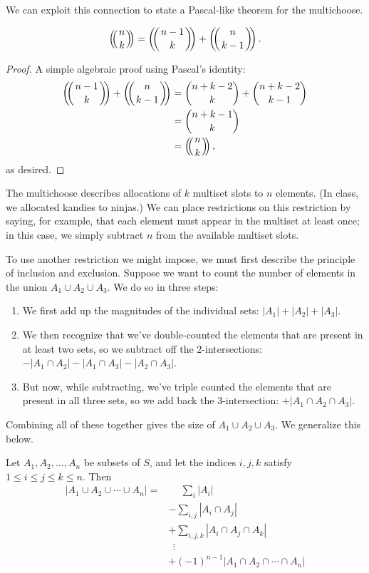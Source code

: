 \documentclass[../m055main.tex]{subfiles}
\begin{document}
We can exploit this connection to state a Pascal-like theorem for the multichoose.

\begin{theorem}[]
    \[ \mchoose{n}{k} = \mchoose{n-1}{k} + \mchoose{n}{k-1}. \]
\end{theorem}

\begin{proof}
    A simple algebraic proof using Pascal's identity:
    \begin{align*}
        \mchoose{n-1}{k} + \mchoose{n}{k-1} &= {n+k-2 \choose k} + {n+k-2 \choose k-1} \\
        &= {n+k-1 \choose k} \\
        &= \mchoose{n}{k},
    \end{align*}
    as desired.
\end{proof}

The multichoose describes allocations of $k$ multiset slots to $n$ elements.
(In class, we allocated kandies to ninjas.)
We can place restrictions on this restriction by saying, for example, that each element must appear in the multiset at least once; in this case, we simply subtract $n$ from the available multiset slots.

To use another restriction we might impose, we must first describe the principle of inclusion and exclusion.
Suppose we want to count the number of elements in the union $A_1 \cup A_2 \cup A_3$.
We do so in three steps:
\begin{enumerate}
    \item We first add up the magnitudes of the individual sets: $|A_1| + |A_2| + |A_3|$.
    \item We then recognize that we've double-counted the elements that are present in at least two sets, so we subtract off the 2-intersections: $- |A_1 \cap A_2| - |A_1 \cap A_3| - |A_2 \cap A_3|$.
    \item But now, while subtracting, we've triple counted the elements that are present in all three sets, so we add back the 3-intersection: $+ |A_1 \cap A_2 \cap A_3|$.
\end{enumerate}
Combining all of these together gives the size of $A_1 \cup A_2 \cup A_3$.
We generalize this below.

\begin{theorem}
    Let $A_1, A_2, \ldots, A_n$ be subsets of $S$, and let the indices $i,j,k$ satisfy $1 \leq i \leq j \leq k \leq n$.
    Then
    \begin{align*}
        |A_1 \cup A_2 \cup \cdots \cup A_n| =& \phantom{+}\sum_{i} |A_i| \\
        & - \sum_{i,j} |A_i \cap A_j| \\
        & + \sum_{i,j,k} |A_i \cap A_j \cap A_k| \\
        & \;\,\vdots \\
        & + (-1)^{n-1} |A_1 \cap A_2 \cap \cdots \cap A_n|
    \end{align*}
\end{theorem}
\end{document}
